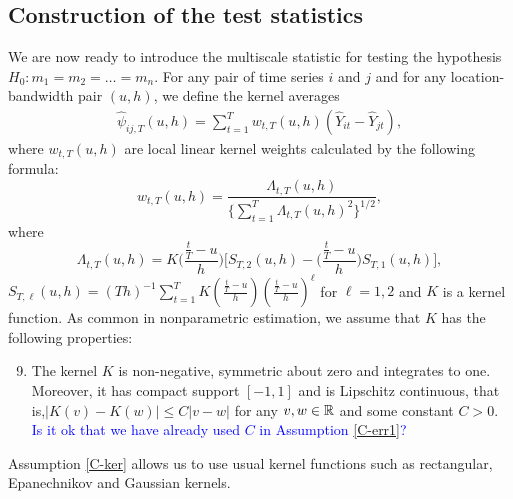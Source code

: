 \documentclass[a4paper,12pt]{article}
\makeatletter
\renewcommand{\eqref}[1]{\tagform@{\ref{#1}}}
\makeatother
\begin{document}


\subsection{Construction of the test statistics}\label{subsec:test:stat}

We are now ready to introduce the multiscale statistic for testing the hypothesis \linebreak $H_0: m_1 = m_2 = \ldots = m_n$. For any pair of time series $i$ and $j$ and for any location-bandwidth pair $(u, h)$, we define the kernel averages
\begin{align}\label{eq:psi_hat_ij}
 \widehat{\psi}_{ij, T}(u, h) = \sum\limits_{t=1}^T w_{t,T}(u, h)(\widehat{Y}_{it} - \widehat{Y}_{jt}),
 \end{align}
where $w_{t,T}(u, h)$ are local linear kernel weights calculated by the following formula:
\begin{equation}\label{eq:weights}
w_{t,T}(u, h) = \frac{\Lambda_{t,T}(u, h)}{ \{\sum\nolimits_{t=1}^T \Lambda_{t,T}(u, h)^2 \}^{1/2} }, 
\end{equation}
where
\[ \Lambda_{t,T}(u, h) = K\Big(\frac{\frac{t}{T}-u}{h}\Big) \Big[ S_{T,2}(u, h) - \Big(\frac{\frac{t}{T}-u}{h}\Big) S_{T,1}(u, h) \Big], \]
$S_{T,\ell}(u, h) = (Th)^{-1} \sum\nolimits_{t=1}^T K(\frac{\frac{t}{T}-u}{h}) (\frac{\frac{t}{T}-u}{h})^\ell$ for $\ell = 1,2$ and $K$ is a kernel function. As common in nonparametric estimation, we assume that $K$ has the following properties: 
\begin{enumerate}[label=(C\arabic*),leftmargin=1.05cm]
\setcounter{enumi}{8}
\item \label{C-ker} The kernel $K$ is non-negative, symmetric about zero and integrates to one. Moreover, it has compact support $[-1,1]$ and is Lipschitz continuous, that is,\linebreak $|K(v) - K(w)| \le C |v-w|$ for any $v, w \in \mathbb{R}$ and some constant $C > 0$. \textcolor{blue}{Is it ok that we have already used $C$ in Assumption \ref{C-err1}?}
\end{enumerate} 
Assumption \ref{C-ker} allows us to use usual kernel functions such as rectangular, Epanechnikov and Gaussian kernels.
\end{document}
